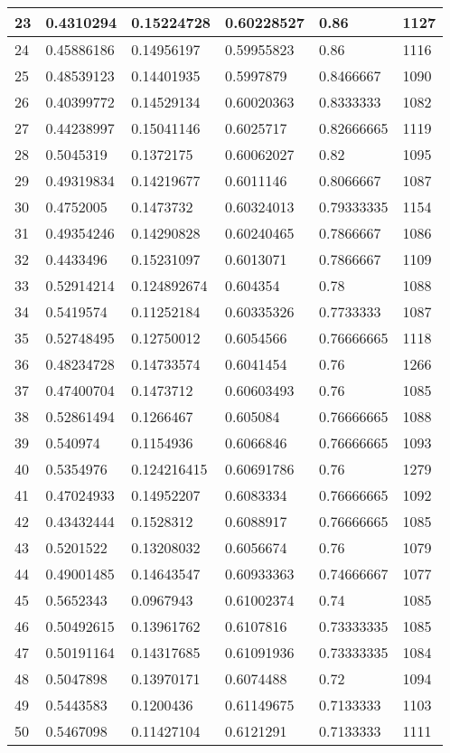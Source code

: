 \begin{longtable}{|l|l|l|l|l|l|}
23 & 0.4310294 & 0.15224728 & 0.60228527 & 0.86 & 1127 \\ \hline 
24 & 0.45886186 & 0.14956197 & 0.59955823 & 0.86 & 1116 \\ \hline 
25 & 0.48539123 & 0.14401935 & 0.5997879 & 0.8466667 & 1090 \\ \hline 
26 & 0.40399772 & 0.14529134 & 0.60020363 & 0.8333333 & 1082 \\ \hline 
27 & 0.44238997 & 0.15041146 & 0.6025717 & 0.82666665 & 1119 \\ \hline 
28 & 0.5045319 & 0.1372175 & 0.60062027 & 0.82 & 1095 \\ \hline 
29 & 0.49319834 & 0.14219677 & 0.6011146 & 0.8066667 & 1087 \\ \hline 
30 & 0.4752005 & 0.1473732 & 0.60324013 & 0.79333335 & 1154 \\ \hline 
31 & 0.49354246 & 0.14290828 & 0.60240465 & 0.7866667 & 1086 \\ \hline 
32 & 0.4433496 & 0.15231097 & 0.6013071 & 0.7866667 & 1109 \\ \hline 
33 & 0.52914214 & 0.124892674 & 0.604354 & 0.78 & 1088 \\ \hline 
34 & 0.5419574 & 0.11252184 & 0.60335326 & 0.7733333 & 1087 \\ \hline 
35 & 0.52748495 & 0.12750012 & 0.6054566 & 0.76666665 & 1118 \\ \hline 
36 & 0.48234728 & 0.14733574 & 0.6041454 & 0.76 & 1266 \\ \hline 
37 & 0.47400704 & 0.1473712 & 0.60603493 & 0.76 & 1085 \\ \hline 
38 & 0.52861494 & 0.1266467 & 0.605084 & 0.76666665 & 1088 \\ \hline 
39 & 0.540974 & 0.1154936 & 0.6066846 & 0.76666665 & 1093 \\ \hline 
40 & 0.5354976 & 0.124216415 & 0.60691786 & 0.76 & 1279 \\ \hline 
41 & 0.47024933 & 0.14952207 & 0.6083334 & 0.76666665 & 1092 \\ \hline 
42 & 0.43432444 & 0.1528312 & 0.6088917 & 0.76666665 & 1085 \\ \hline 
43 & 0.5201522 & 0.13208032 & 0.6056674 & 0.76 & 1079 \\ \hline 
44 & 0.49001485 & 0.14643547 & 0.60933363 & 0.74666667 & 1077 \\ \hline 
45 & 0.5652343 & 0.0967943 & 0.61002374 & 0.74 & 1085 \\ \hline 
46 & 0.50492615 & 0.13961762 & 0.6107816 & 0.73333335 & 1085 \\ \hline 
47 & 0.50191164 & 0.14317685 & 0.61091936 & 0.73333335 & 1084 \\ \hline 
48 & 0.5047898 & 0.13970171 & 0.6074488 & 0.72 & 1094 \\ \hline 
49 & 0.5443583 & 0.1200436 & 0.61149675 & 0.7133333 & 1103 \\ \hline 
50 & 0.5467098 & 0.11427104 & 0.6121291 & 0.7133333 & 1111 \\ \hline 
\end{longtable}